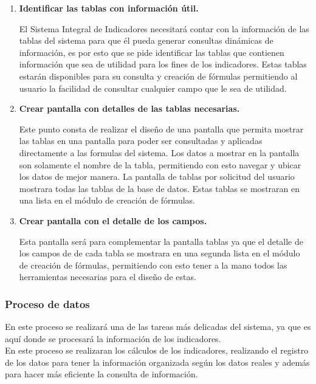 		    	\begin{enumerate}[1.]
		    		\item \textbf{Identificar las tablas con informaci\'on \'util.}

		    			El Sistema Integral de Indicadores necesitar\'a contar con la informaci\'on de las tablas del sistema para que \'el pueda generar consultas din\'amicas de informaci\'on, es por esto que se pide identificar las tablas que contienen informaci\'on que sea de utilidad para los fines de los indicadores.
		    			Estas tablas estar\'an disponibles para su consulta y creaci\'on de f\'ormulas permitiendo al usuario la facilidad de consultar cualquier campo que le sea de utilidad.
		    		\item \textbf{Crear pantalla con detalles de las tablas necesarias.}

		    			Este punto consta de realizar el dise\~no de una pantalla  que permita mostrar las tablas en una pantalla para poder ser consultadas y aplicadas directamente a las formulas del sistema.
						Los datos a mostrar en la pantalla son solamente el nombre de la tabla, permitiendo con esto navegar y ubicar los datos de mejor manera. La pantalla de tablas por solicitud del usuario mostrara todas las tablas de la base de datos.
						Estas tablas se mostraran en una lista en el m\'odulo de creaci\'on de f\'ormulas.
					\item \textbf{Crear pantalla con el detalle de los campos.}

						Esta pantalla ser\'a para complementar la pantalla tablas ya que el detalle de los campos de de cada tabla se mostrara en una segunda lista en el m\'odulo de creaci\'on de f\'ormulas, permitiendo con esto tener a la mano todos las herramientas necesarias para el dise\~no de estas.

		    	\end{enumerate}

		    \subsubsection{Proceso de datos}

		    	En este proceso se realizar\'a una de las tareas m\'as delicadas del sistema, ya que es aqu\'i donde se procesar\'a la informaci\'on de los indicadores.\\

				En este proceso se realizaran los c\'alculos de los indicadores, realizando el registro de los datos para tener la informaci\'on organizada seg\'un los datos reales y adem\'as para hacer m\'as eficiente la consulta de informaci\'on.\\

